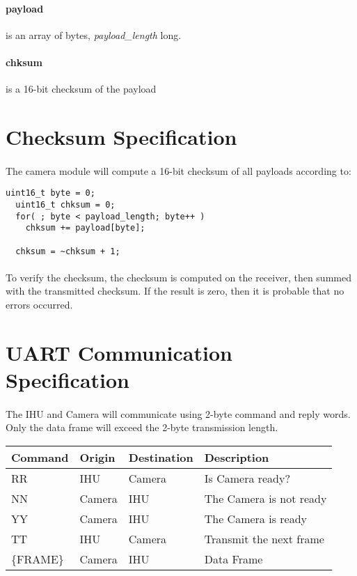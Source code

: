 \documentclass[10pt,letterpaper]{article}
\begin{document}
\paragraph{payload} is an array of bytes, \textit{payload\_length} long.
\paragraph{chksum} is a 16-bit checksum of the payload
\section*{Checksum Specification}
\paragraph{}The camera module will compute a 16-bit checksum of all payloads according to:
\begin{lstlisting}[frame=single]
  uint16_t byte = 0;
  uint16_t chksum = 0;
  for( ; byte < payload_length; byte++ )
    chksum += payload[byte];
  
  chksum = ~chksum + 1;
\end{lstlisting}
\paragraph{}To verify the checksum, the checksum is computed on the receiver, then summed with the transmitted checksum.  If the result is zero, then it is probable that no errors occurred.

\section*{UART Communication Specification}
\paragraph*{}The IHU and Camera will communicate using 2-byte command and reply words.  Only the data frame will exceed the 2-byte transmission length.
\begin{table}[h]
\begin{tabular}{|l|l|l|l|}
\hline
\textbf{Command} & \textbf{Origin} & \textbf{Destination} & \textbf{Description} \\
\hline
\hline
RR & IHU & Camera & Is Camera ready?\\
\hline
NN & Camera & IHU & The Camera is not ready\\
\hline
YY & Camera & IHU & The Camera is ready\\
\hline
TT & IHU & Camera & Transmit the next frame\\
\hline
\{FRAME\} & Camera & IHU & Data Frame\\
\hline
\end{tabular}
\end{table}
\end{document}
